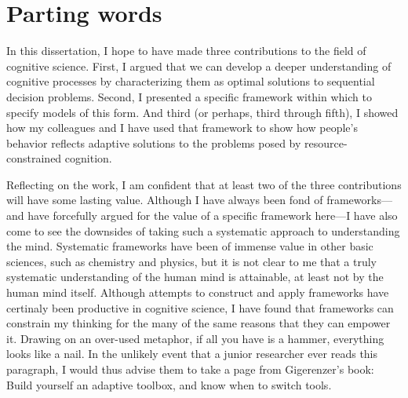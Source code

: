 


\section{Parting words}

In this dissertation, I hope to have made three contributions to the field of cognitive science. First, I argued that we can develop a deeper understanding of cognitive processes by characterizing them as optimal solutions to sequential decision problems. Second, I presented a specific framework within which to specify models of this form. And third (or perhaps, third through fifth), I showed how my colleagues and I have used that framework to show how people's behavior reflects adaptive solutions to the problems posed by resource-constrained cognition.

Reflecting on the work, I am confident that at least two of the three contributions will have some lasting value. Although I have always been fond of frameworks---and have forcefully argued for the value of a specific framework here---I have also come to see the downsides of taking such a systematic approach to understanding the mind. Systematic frameworks have been of immense value in other basic sciences, such as chemistry and physics, but it is not clear to me that a truly systematic understanding of the human mind is attainable, at least not by the human mind itself. Although attempts to construct and apply frameworks have certinaly been productive in cognitive science, I have found that frameworks can constrain my thinking for the many of the same reasons that they can empower it. Drawing on an over-used metaphor, if all you have is a hammer, everything looks like a nail. In the unlikely event that a junior researcher ever reads this paragraph, I would thus advise them to take a page from Gigerenzer's book: Build yourself an adaptive toolbox, and know when to switch tools.
